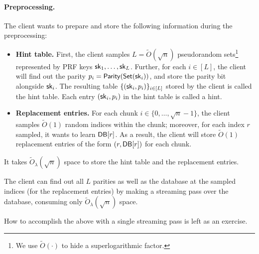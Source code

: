 \paragraph{Preprocessing.}
The client wants to prepare and store the following information during the preprocessing:  
\begin{itemize}
\item 
{\bf Hint table.}
First, the client samples
$L = \widetilde{O}(\sqrt{n})$
pseudorandom sets\footnote{We use $\widetilde{O}(\cdot)$ to hide
a superlogarithmic factor.} represented by PRF keys ${\sf sk}_1, \ldots, {\sf sk}_L$.
Further, for each $i \in [L]$, the client will 
find out the parity 
$p_i = {\sf Parity}({\sf Set}({\sf sk}_i))$, and store the parity bit alongside ${\sf sk}_i$.
The resulting table $\{({\sf sk}_i, p_i)\}_{i \in [L]}$ 
stored by the client
is called the hint table.
Each entry $({\sf sk}_i, p_i)$ in the hint table is called a hint.
\item 
{\bf Replacement entries.}
For each chunk $i \in \{0, \ldots, \sqrt{n}-1\}$, the client
samples $\widetilde{O}(1)$
random indices within the chunk; moreover, for each index $r$ sampled,
it wants to learn ${\sf DB}[r]$.  
As a result, the client will store $\widetilde{O}(1)$
replacement entries of the form $(r, {\sf DB}[r])$ for each chunk. 
\end{itemize}

It takes $\widetilde{O}_\lambda(\sqrt{n})$ space to
store the hint table and the replacement entries.

\begin{claim}
The client can find out all $L$ parities
as well as
the database at the sampled indices (for the replacement entries)
by making a streaming pass over the database, consuming
only $\widetilde{O}_\lambda(\sqrt{n})$ space.
\end{claim}
How to accomplish the above with a single streaming pass is left as an exercise.

